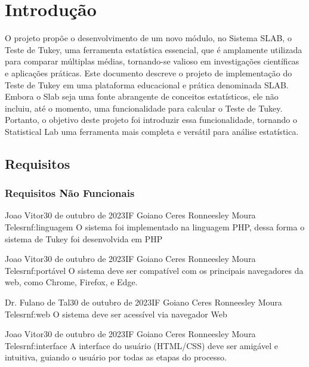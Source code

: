 \chapter{Introdução}
\label{capitulo:introducao}

O projeto propõe o desenvolvimento de um novo módulo, no Sistema SLAB, o Teste de Tukey, uma ferramenta estatística essencial, que é amplamente utilizada para comparar múltiplas médias, tornando-se valioso em investigações científicas e aplicações práticas. Este documento descreve o projeto de implementação do Teste de Tukey em uma plataforma educacional e prática denominada SLAB. Embora o Slab seja uma fonte abrangente de conceitos estatísticos, ele não incluiu, até o momento, uma funcionalidade para calcular o Teste de Tukey. Portanto, o objetivo deste projeto foi introduzir essa funcionalidade, tornando o Statistical Lab uma ferramenta mais completa e versátil para análise estatística.

\section{Requisitos}


\subsection{Requisitos Não Funcionais}

{Joao Vitor}{30 de outubro de 2023}{IF Goiano Ceres}
{Ronneesley Moura Teles}{rnf:linguagem}
{O sistema foi implementado na linguagem PHP, dessa forma o sistema de Tukey foi desenvolvida em PHP}

{Joao Vitor}{30 de outubro de 2023}{IF Goiano Ceres}
{Ronneesley Moura Teles}{rnf:portável}
{O sistema deve ser compatível com os principais navegadores da web, como Chrome, Firefox, e Edge.}

{Dr. Fulano de Tal}{30 de outubro de 2023}{IF Goiano Ceres}
{Ronneesley Moura Teles}{rnf:web}
{O sistema deve ser acessível via navegador Web}

{Joao Vitor}{30 de outubro de 2023}{IF Goiano Ceres}
{Ronneesley Moura Teles}{rnf:interface}
{A interface do usuário (HTML/CSS) deve ser amigável e intuitiva, guiando o usuário por todas as etapas do processo.}


